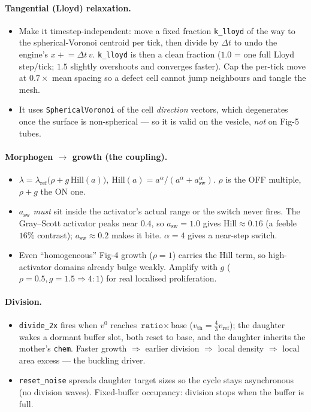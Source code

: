 \documentclass[11pt]{article}
\begin{document}
\paragraph{Tangential (Lloyd) relaxation.}
\begin{itemize}\itemsep2pt
\item Make it timestep-independent: move a fixed fraction \texttt{k\_lloyd} of the way to the
spherical-Voronoi centroid per tick, then divide by $\Delta t$ to undo the engine's
$x\!\mathrel{+}=\!\Delta t\,v$. \texttt{k\_lloyd} is then a clean fraction ($1.0$ = one full Lloyd
step/tick; $1.5$ slightly overshoots and converges faster). Cap the per-tick move at
$0.7\times$ mean spacing so a defect cell cannot jump neighbours and tangle the mesh.
\item It uses \texttt{SphericalVoronoi} of the cell \emph{direction} vectors, which degenerates once
the surface is non-spherical --- so it is valid on the vesicle, \emph{not} on Fig-5 tubes.
\end{itemize}

\paragraph{Morphogen $\to$ growth (the coupling).}
\begin{itemize}\itemsep2pt
\item $\lambda=\lambda_{\text{ref}}\big(\rho + g\,\mathrm{Hill}(a)\big),\ \mathrm{Hill}(a)=
a^{\alpha}/(a^{\alpha}+a_{\text{sw}}^{\alpha})$. $\rho$ is the OFF multiple, $\rho+g$ the ON one.
\item $a_{\text{sw}}$ \emph{must} sit inside the activator's actual range or the switch never fires.
The Gray--Scott activator peaks near $0.4$, so $a_{\text{sw}}\!=\!1.0$ gives
$\mathrm{Hill}\!\approx\!0.16$ (a feeble $16\%$ contrast); $a_{\text{sw}}\!\approx\!0.2$ makes it
bite. $\alpha\!=\!4$ gives a near-step switch.
\item Even ``homogeneous'' Fig-4 growth ($\rho\!=\!1$) carries the Hill term, so high-activator
domains already bulge weakly. Amplify with $g$ ($\rho\!=\!0.5,g\!=\!1.5\!\Rightarrow\!4{:}1$) for
real localised proliferation.
\end{itemize}

\paragraph{Division.}
\begin{itemize}\itemsep2pt
\item \texttt{divide\_2x} fires when $v^0$ reaches $\texttt{ratio}\!\times\!$base
($v_{\text{th}}\!=\!\tfrac43 v_{\text{ref}}$); the daughter wakes a dormant buffer slot, both reset
to base, and the daughter inherits the mother's \texttt{chem}. Faster growth $\Rightarrow$ earlier
division $\Rightarrow$ local density $\Rightarrow$ local area excess --- the buckling driver.
\item \texttt{reset\_noise} spreads daughter target sizes so the cycle stays asynchronous (no
division waves). Fixed-buffer occupancy: division stops when the buffer is full.
\end{itemize}
\end{document}
